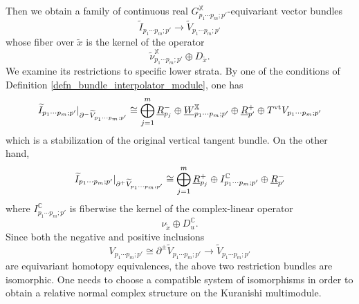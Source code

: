 \documentclass[reqno, 10pt]{amsart}
\numberwithin{equation}{section}
\numberwithin{equation}{section}
\theoremstyle{definition}
\theoremstyle{remark}
\newcommand{\beqn}{\begin{equation*}}
\newcommand{\eeqn}{\end{equation*}}
\newcommand{\mb}{\mathbb}
\newcommand{\wt}{\widetilde}
\newcommand{\uds}[1]{\underline{\smash{#1}}}
\begin{document}
Then we obtain a family of continuous real $G_{p_1 \cdots p_m; p'}^{\mb X}$-equivariant vector bundles
\beqn
\wt I_{p_1 \cdots p_m; p'} \to \wt V_{p_1 \cdots p_m; p'}
\eeqn
whose fiber over $\wt x$ is the kernel of the operator 
\beqn
\wt \nu_{p_1 \cdots p_m; p'}^{\mb X} \oplus D_{\wt x}.
\eeqn
We examine its restrictions to specific lower strata. By one of the conditions of Definition \ref{defn_bundle_interpolator_module}, one has 
\beqn
\wt I_{p_1 \cdots p_m; p'}|_{\partial^- \wt V_{p_1 \cdots p_m; p'}} \cong \bigoplus_{j=1}^m \uds R_{p_j}^- \oplus \uds W_{p_1 \cdots p_m; p'}^{\mb X} \oplus \uds R_{p'}^+ \oplus T^{\rm vt} V_{p_1 \cdots p_m; p'}
\eeqn
which is a stabilization of the original vertical tangent bundle. On the other hand,
\beqn
\wt I_{p_1 \cdots p_m; p'}|_{\partial^+ \wt V_{p_1 \cdots p_m; p'}} \cong \bigoplus_{j=1}^m \uds R_{p_j}^+ \oplus I_{p_1 \cdots p_m; p'}^{\mb C} \oplus \uds R_{p'}^-
\eeqn
where $I_{p_1 \cdots p_m; p'}^{\mb C}$ is fiberwise the kernel of the complex-linear operator
\beqn
\nu_{\wt x} \oplus D_u^{\mb C}.
\eeqn
Since both the negative and positive inclusions
\beqn
V_{p_1 \cdots p_m; p'} \cong \partial^\pm \wt V_{p_1 \cdots p_m; p'} \to \wt V_{p_1 \cdots p_m; p'}
\eeqn
are equivariant homotopy equivalences, the above two restriction bundles are isomorphic. One needs to choose a compatible system of isomorphisms in order to obtain a relative normal complex structure on the Kuranishi multimodule.
\end{document}
